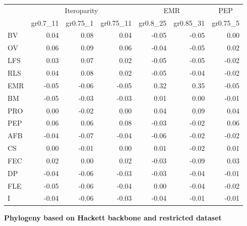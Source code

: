 \begin{landscape}
\begin{table}
\begin{footnotesize}
\begin{tabular}{@{}l|rrr|rr|r@{}}
\toprule
 & \multicolumn{3}{c|}{Iteroparity} & \multicolumn{2}{c|}{EMR} & \multicolumn{1}{c}{PEP}\\
 & gr0.7\_11 & gr0.75\_1 & gr0.75\_11 & gr0.8\_25 & gr0.85\_31 & gr0.75\_5\\
\midrule
BV & 0.04 & 0.08 & 0.04 & -0.05 & -0.05 & 0.00\\
OV & 0.06 & 0.09 & 0.06 & -0.04 & -0.05 & 0.02\\
LFS & 0.03 & 0.07 & 0.02 & -0.05 & -0.05 & -0.02\\
RLS & 0.04 & 0.08 & 0.02 & -0.05 & -0.04 & -0.02\\
EMR & -0.05 & -0.06 & -0.05 & 0.32 & 0.35 & -0.05\\
BM & -0.05 & -0.03 & -0.03 & 0.01 & 0.00 & -0.01\\
PRO & 0.00 & -0.02 & 0.00 & 0.04 & 0.09 & 0.04\\
PEP & 0.06 & 0.06 & 0.08 & -0.03 & -0.02 & 0.06\\
AFB & -0.04 & -0.07 & -0.04 & -0.06 & -0.02 & -0.02\\
CS & 0.00 & -0.01 & 0.00 & 0.01 & -0.02 & 0.01\\
FEC & 0.02 & 0.00 & 0.02 & -0.03 & -0.09 & 0.03\\
DP & -0.04 & -0.06 & -0.03 & -0.03 & -0.04 & -0.01\\
FLE & -0.05 & -0.06 & -0.04 & 0.00 & -0.04 & -0.02\\
I & -0.04 & -0.06 & -0.03 & -0.04 & -0.01 & -0.01\\
\bottomrule
\end{tabular}

\textbf{Phylogeny based on Hackett backbone and restricted dataset}


\end{footnotesize}
\end{table}
\end{landscape}
